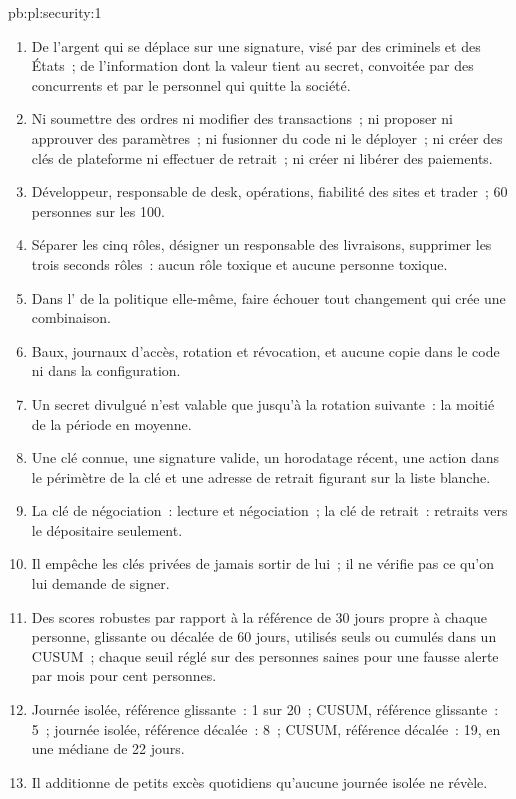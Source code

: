 \begin{solution}{pb:pl:security:1}
\begin{enumerate}
\item De l'argent qui se déplace sur une signature, visé par des criminels et des États~; de l'information dont la valeur tient au secret, convoitée par des concurrents et par le personnel qui quitte la société.
\item Ni soumettre des ordres ni modifier des transactions~; ni proposer ni approuver des paramètres~; ni fusionner du code ni le déployer~; ni créer
des clés de plateforme ni effectuer de retrait~; ni créer ni libérer des paiements.
\item Développeur, responsable de desk, opérations, fiabilité des sites et trader~; 60 personnes sur les 100.
\item Séparer les cinq rôles, désigner un responsable des livraisons, supprimer les trois seconds rôles~: aucun rôle toxique et aucune personne toxique.
\item Dans l' de la politique elle-même, faire échouer tout changement qui crée une combinaison.
\item Baux, journaux d'accès, rotation et révocation, et aucune copie dans le code ni dans la configuration.
\item Un secret divulgué n'est valable que jusqu'à la rotation suivante~: la moitié de la période en moyenne.
\item Une clé connue, une signature valide, un horodatage récent, une action dans le périmètre de la clé et une adresse de retrait figurant sur la liste blanche.
\item La clé de négociation~: lecture et négociation~; la clé de retrait~: retraits vers le dépositaire seulement.
\item Il empêche les clés privées de jamais sortir de lui~; il ne vérifie pas ce qu'on lui demande de signer.
\item Des scores robustes par rapport à la référence de 30 jours propre à chaque personne, glissante ou décalée de 60 jours, utilisés seuls ou cumulés dans un CUSUM~; chaque seuil
réglé sur des personnes saines pour une fausse alerte par mois pour cent personnes.
\item Journée isolée, référence glissante~: 1 sur 20~; CUSUM, référence glissante~: 5~; journée isolée, référence décalée~: 8~; CUSUM, référence décalée~: 19, en une médiane de 22 jours.
\item Il additionne de petits excès quotidiens qu'aucune journée isolée ne révèle.

\end{enumerate}
\end{solution}

